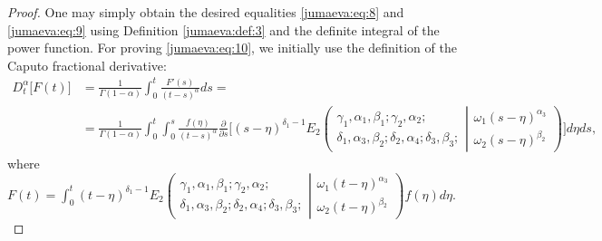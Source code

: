 \documentclass{amsart}
\numberwithin{equation}{section}
\begin{document}
\begin{proof}
One may simply obtain the desired equalities \eqref{jumaeva:eq:8} and \eqref{jumaeva:eq:9}  using Definition \ref{jumaeva:def:3} and the definite integral of the power function. For proving \eqref{jumaeva:eq:10}, we initially use the definition of the Caputo fractional derivative:
\begin{align*}
   D_t^\alpha\big[F(t)\big]&=\frac{1}{\Gamma(1-\alpha)}\int_0^t \frac{F'(s)}{(t-s)^\alpha} ds= \\
   &=\frac{1}{\Gamma(1-\alpha)}\int_0^t \int_0^s \frac{f(\eta)}{(t-s)^\alpha}\frac{\partial}{\partial s}\bigg[(s-\eta)^{\delta_1-1 }E_2\left(\begin{array}{c}
\gamma_1,\alpha_1, \beta_1 ; \gamma_2, \alpha_2 ; \\
\delta_1, \alpha_3, \beta_2 ;\delta_2, \alpha_4; \delta_3, \beta_3 ; 
\end{array} \left| 
\begin{array}{c}
\omega_1 (s-\eta)^{\alpha_3} \\
\omega_2 (s-\eta)^{\beta_2} 
\end{array} 
\right.
\right)\bigg]d\eta ds,
\end{align*}
where $F(t)=\int_0^t (t-\eta)^{\delta_1-1} E_2\left(\begin{array}{c}
\gamma_1,\alpha_1, \beta_1 ; \gamma_2, \alpha_2 ; \\
\delta_1, \alpha_3, \beta_2 ;\delta_2, \alpha_4; \delta_3, \beta_3 ; 
\end{array} \left| 
\begin{array}{c}
\omega_1 (t-\eta)^{\alpha_3} \\
\omega_2 (t-\eta)^{\beta_2} 
\end{array} 
\right.
\right)f(\eta) d\eta. $


\end{proof}
\end{document}
